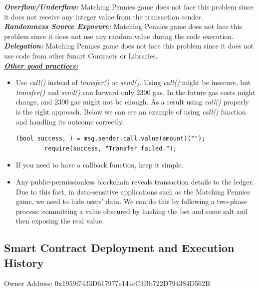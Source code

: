 \documentclass[12pt,a4paper]{article}
\begin{document}
\textbf{\emph{Overflow/Underflow: }}Matching Pennies game does not face this
problem since it does not receive any integer value from the transaction sender.
\\

\textbf{\emph{Randomness Source Exposure: }}Matching Pennies game does not face
this problem since it does not use any random value during the code execution.
\\

\textbf{\emph{Delegation: }}Matching Pennies game does not face this problem
since it does not use code from other Smart Contracts or Libraries. \\

\textbf{\emph{\underline{Other good practices:}}} \\ 

\begin{itemize}
    \item Use \emph{call()} instead of \emph{transfer()} or \emph{send()}. Using
    \emph{call()}  might be insecure, but \emph{transfer()} and \emph{send()}
    can forward only 2300 gas. In the future gas costs might change, and 2300
    gas might not be enough. As a result using \emph{call()} properly is the
    right approach. Below we can see an example of using \emph{call()} function
    and handling its outcome correctly.\\
    \begin{lstlisting}[language=Solidity]
        (bool success, ) = msg.sender.call.value(amount)(""); 
        require(success, "Transfer failed.");
    \end{lstlisting}
    \item If you need to have a callback function, keep it simple.
    \item Any public-permissionless blockchain reveals transaction details to 
    the ledger. Due to this fact, in data-sensitive applications such as the
    Matching Pennies game, we need to hide users' data. We can do this by following a
    two-phase process: committing a value obscured by hashing the bet and some salt
    and then exposing the real value.
\end{itemize}

\subsection*{Smart Contract Deployment and Execution History}

Owner Address: 0x1959f7433D617977e144cC3Bb722D794384D562B
\end{document}
